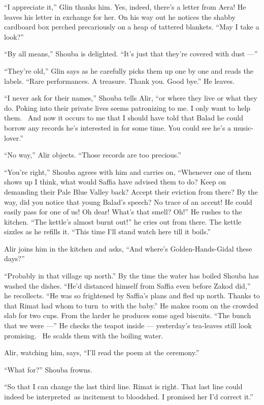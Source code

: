 \documentclass[twoside,11pt,openany]{book}
\begin{document}
``I appreciate it,'' Glin thanks him. Yes, indeed, there's a letter from Aera!
He leaves his letter in exchange for her.
On his way out he notices the shabby cardboard box perched precariously on a heap of
tattered blankets. ``May I take a look?''

``By all means,'' Shouba is delighted. ``It's just that they're covered with dust
---''

``They're old,'' Glin says as he carefully picks them up one by one and reads the labels.
``Rare performances. A treasure. Thank you. Good bye.'' He leaves.

``I never ask for their names,'' Shouba tells Alir, ``or where they live or what they do. Poking into their
private lives seems patronizing to me. I only want to help them. ~And now it occurs to me that I should have told that
Balad he could borrow any records he's interested in for some time.  You could see he's a music-lover.''

``No way,'' Alir objects. ``Those records are too precious.''

``You're right,'' Shouba agrees with him and carries on, ``Whenever one of them
shows up I think, what would Saffia have advised them to do? Keep on demanding their Pale Blue Valley back? Accept
their eviction from there? By the way, did you notice that young Balad's speech? No trace of an accent! He could
easily pass for one of us! Oh dear! What's that smell? Oh!'' He rushes to the kitchen. ``The
kettle's almost burnt out!'' he cries out from there. The kettle sizzles as he refills it.
``This time I'll stand watch here till it boils.''

Alir joins him in the kitchen and asks, ``And where's Golden-Hands-Gidal these days?''

``Probably in that village up north.'' By the time the water has boiled Shouba has washed the
dishes. ``He'd distanced himself from Saffia even before Zakod did,'' he
recollects. ``He was so frightened by Saffia's plans and fled up north. Thanks to that Rimat had whom to
turn~to with the baby.'' He makes room on the crowded slab for two cups. From the larder he produces some
aged biscuits. ``The bunch that we were ---'' He checks the teapot inside ---  yesterday's
tea-leaves still look promising. ~He scalds them with the boiling water.

Alir, watching him, says, ``I'll read the poem at the ceremony.''

``What for?'' Shouba frowns.

``So that I can change the last third line. Rimat is right. That last line could indeed be interpreted~as
incitement to bloodshed. I promised her I'd correct it.''
\end{document}
